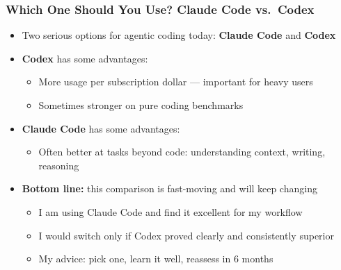 \documentclass[aspectratio=169, 12pt]{beamer}
\begin{document}
\begin{frame}
\frametitle{Which One Should You Use? Claude Code vs.\ Codex}

\begin{itemize}
    \item Two serious options for agentic coding today: \textbf{Claude Code} and \textbf{Codex}
    \vspace{.05in}
    \item \textbf{Codex} has some advantages:
        \begin{itemize}
            \item[$\circ$] More usage per subscription dollar --- important for heavy users
            \item[$\circ$] Sometimes stronger on pure coding benchmarks
        \end{itemize}
    \vspace{.05in}
    \item \textbf{Claude Code} has some advantages:
        \begin{itemize}
            \item[$\circ$] Often better at tasks beyond code: understanding context, writing, reasoning
        \end{itemize}
    \vspace{.05in}
    \item \textbf{Bottom line:} this comparison is fast-moving and will keep changing
        \begin{itemize}
            \item[$\circ$] I am using Claude Code and find it excellent for my workflow
            \item[$\circ$] I would switch only if Codex proved clearly and consistently superior
            \item[$\circ$] My advice: pick one, learn it well, reassess in 6 months
        \end{itemize}
\end{itemize}

\end{frame}
\end{document}
